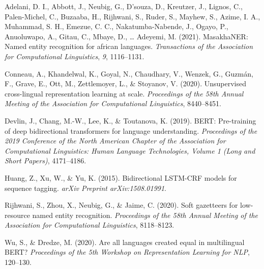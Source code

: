\documentclass[
]{article}
\newlength{\cslhangindent}
\newenvironment{CSLReferences}[2] %
 {\begin{list}{}{%
  \setlength{\itemindent}{0pt}
  \setlength{\leftmargin}{0pt}
  \setlength{\parsep}{0pt}
  \ifodd #1
   \setlength{\leftmargin}{\cslhangindent}
   \setlength{\itemindent}{-1\cslhangindent}
  \fi
  \setlength{\itemsep}{#2\baselineskip}}}
 {\end{list}}
\begin{document}
\label{refs}
\begin{CSLReferences}{1}{0}
Adelani, D. I., Abbott, J., Neubig, G., D'souza, D., Kreutzer, J.,
Lignos, C., Palen-Michel, C., Buzaaba, H., Rijhwani, S., Ruder, S.,
Mayhew, S., Azime, I. A., Muhammad, S. H., Emezue, C. C.,
Nakatumba-Nabende, J., Ogayo, P., Anuoluwapo, A., Gitau, C., Mbaye, D.,
\ldots{} Adeyemi, M. (2021). MasakhaNER: Named entity recognition for
african languages. \emph{Transactions of the Association for
Computational Linguistics}, \emph{9}, 1116--1131.

Conneau, A., Khandelwal, K., Goyal, N., Chaudhary, V., Wenzek, G.,
Guzmán, F., Grave, E., Ott, M., Zettlemoyer, L., \& Stoyanov, V. (2020).
Unsupervised cross-lingual representation learning at scale.
\emph{Proceedings of the 58th Annual Meeting of the Association for
Computational Linguistics}, 8440--8451.

Devlin, J., Chang, M.-W., Lee, K., \& Toutanova, K. (2019). BERT:
Pre-training of deep bidirectional transformers for language
understanding. \emph{Proceedings of the 2019 Conference of the North
American Chapter of the Association for Computational Linguistics: Human
Language Technologies, Volume 1 (Long and Short Papers)}, 4171--4186.

Huang, Z., Xu, W., \& Yu, K. (2015). Bidirectional LSTM-CRF models for
sequence tagging. \emph{arXiv Preprint arXiv:1508.01991}.

Rijhwani, S., Zhou, X., Neubig, G., \& Jaime, C. (2020). Soft gazetteers
for low-resource named entity recognition. \emph{Proceedings of the 58th
Annual Meeting of the Association for Computational Linguistics},
8118--8123.

Wu, S., \& Dredze, M. (2020). Are all languages created equal in
multilingual BERT? \emph{Proceedings of the 5th Workshop on
Representation Learning for NLP}, 120--130.

\end{CSLReferences}
\end{document}
